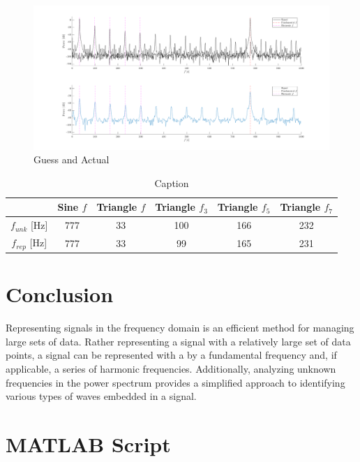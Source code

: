 \documentclass[letterpaper,12pt]{article}
\begin{document}
\begin{figure}[ht]
    \centering
    \includegraphics[width=1\linewidth]{mysteryLab.png}
    \caption{Guess and Actual}
    \label{GuessActual}
\end{figure}

\begin{table}[ht]
    \centering
    \begin{tabular}{c|c||c|c|c|c}
         & Sine $f$ & Triangle $f$ & Triangle $f_3$ & Triangle $f_5$ & Triangle $f_7$ \\ \hline
         $f_{unk}$ [Hz] & 777  & 33  & 100 & 166 & 232\\ \hline
         $f_{rep}$ [Hz] & 777  & 33  & 99  & 165 & 231\\ 
    \end{tabular}
    \caption{Caption}
    \label{unknownSignalTable}
\end{table}

\section{Conclusion}
Representing signals in the frequency domain is an efficient method for managing large sets of data. Rather representing a signal with a relatively large set of data points, a signal can be represented with a by a fundamental frequency and, if applicable, a series of harmonic frequencies. Additionally, analyzing unknown frequencies in the power spectrum provides a simplified approach to identifying various types of waves embedded in a signal.

\newpage
\appendix

\section{MATLAB Script}

\end{document}
